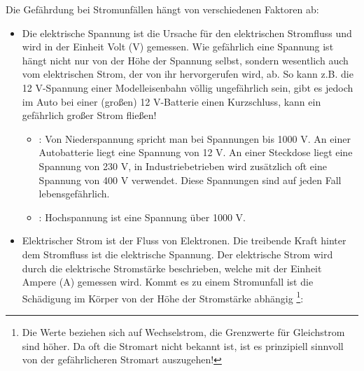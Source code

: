 Die Gefährdung bei Stromunfällen
hängt von verschiedenen Faktoren ab:
\begin{itemize}
	\item {} Die elektrische Spannung
	ist die Ursache für den elektrischen Stromfluss und wird
	in der Einheit Volt (V) gemessen. Wie gefährlich eine Spannung ist hängt nicht nur von der Höhe der Spannung selbst, sondern wesentlich auch vom elektrischen Strom, der von ihr hervorgerufen wird, ab. So kann z.B. die 12 V-Spannung einer Modelleisenbahn völlig ungefährlich sein, gibt es jedoch im Auto bei einer (großen) 12 V-Batterie einen Kurzschluss, kann ein gefährlich großer Strom fließen!
		\begin{itemize}
		\item {}: Von Niederspannung spricht man bei Spannungen bis 1000 V. An einer Autobatterie liegt eine Spannung von 12 V. An einer Steckdose liegt eine Spannung von 230 V, in Industriebetrieben wird zusätzlich oft eine Spannung von 400 V verwendet. Diese Spannungen sind auf jeden Fall lebensgefährlich. 
		\item {}: Hochspannung ist eine Spannung über 1000 V. 
		\end{itemize}
	\item {} Elektrischer Strom ist der Fluss von Elektronen. Die treibende Kraft hinter dem Stromfluss ist die elektrische Spannung. Der elektrische Strom wird durch die elektrische Stromstärke beschrieben, welche mit der Einheit Ampere (A) gemessen wird. Kommt es zu einem Stromunfall ist die Schädigung im Körper von der Höhe der Stromstärke abhängig \footnote{Die Werte beziehen sich auf Wechselstrom, die Grenzwerte für Gleichstrom sind höher. Da oft die Stromart nicht bekannt ist, ist es prinzipiell sinnvoll von der gefährlicheren Stromart auszugehen!}:
\end{itemize}
